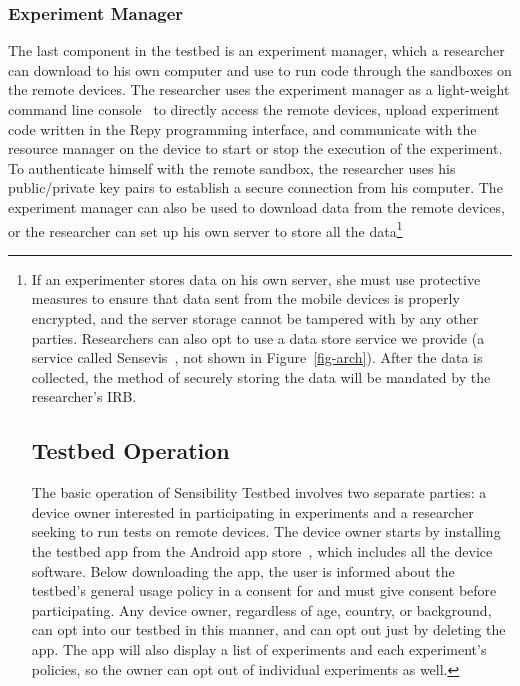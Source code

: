 {%


\subsubsection{Experiment Manager}\label{sec-emt}

The last component in the testbed is an experiment manager, which a 
researcher can download to his own computer and use to run code through 
the sandboxes on the remote devices. 
The researcher uses the experiment manager as a light-weight command line 
console~\cite{demo-kit} to directly access the remote devices, upload 
experiment code written in the Repy programming interface, and
communicate with the resource manager on the device to start 
or stop the execution of the experiment. To authenticate himself with the remote sandbox, the researcher uses 
his public/private key pairs to establish a secure connection from his
computer. 
The experiment manager can also be used to download data from the remote devices, or
the researcher can set up his own server to store all the data\footnote{\scriptsize
If an experimenter stores data on his own server, she must use protective
measures to ensure that data sent from the mobile devices is
properly encrypted, and the server storage cannot be tampered
with by any other parties. Researchers can also opt to use a data 
store service we provide (a service called Sensevis~\cite{sensevis}, 
not shown in Figure~\ref{fig-arch}). After the data is collected, the method of securely storing
the data will be mandated by the researcher's IRB.

\subsection{Testbed Operation}\label{sec-ops}

The basic operation of Sensibility Testbed involves two separate parties: a device owner interested in participating in experiments and a researcher seeking to run tests on remote devices. The device owner starts by installing the testbed app from the Android app
 store~\cite{sensibility-app}, which includes all the device 
software. Below downloading the app, the user is informed about the testbed's general usage policy 
in a consent for and must give consent before participating.
Any device owner, regardless of age, country, or background, can opt into our testbed in this manner, and can opt out just by deleting the app. The 
app will also display a list of experiments and each experiment's policies, so the owner can opt out of individual experiments as well. 

}}

